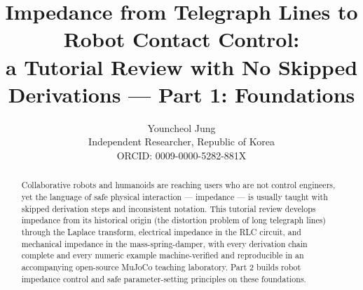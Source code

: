 \documentclass[11pt,a4paper]{article}
\title{Impedance from Telegraph Lines to Robot Contact Control:\\
a Tutorial Review with No Skipped Derivations --- Part 1: Foundations}
\author{Youncheol Jung\\
\small Independent Researcher, Republic of Korea\\
\small ORCID: 0009-0000-5282-881X}
\date{}
\begin{document}
\maketitle

\begin{abstract}
Collaborative robots and humanoids are reaching users who are not control
engineers, yet the language of safe physical interaction --- impedance ---
is usually taught with skipped derivation steps and inconsistent notation.
This tutorial review develops impedance from its historical origin (the
distortion problem of long telegraph lines) through the Laplace transform,
electrical impedance in the RLC circuit, and mechanical impedance in the
mass-spring-damper, with every derivation chain complete and every numeric
example machine-verified and reproducible in an accompanying open-source
MuJoCo teaching laboratory. Part 2 builds robot impedance control and safe
parameter-setting principles on these foundations.
\end{abstract}







\end{document}
